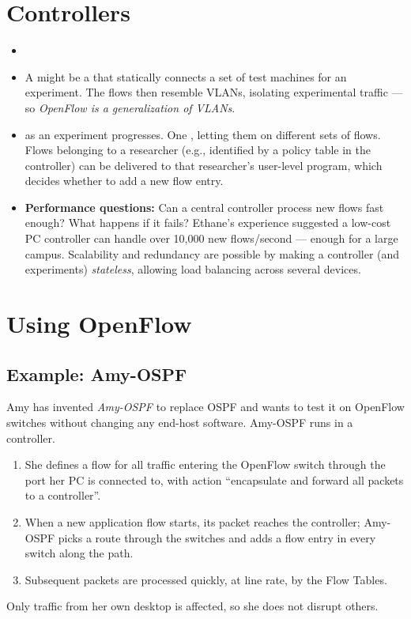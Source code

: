 \section{Controllers}
\begin{itemize}
\item {}
\item A  might be a  that statically connects a set of test machines for an experiment. The flows then resemble VLANs, isolating experimental traffic --- so \emph{OpenFlow is a generalization of VLANs}.
\item {}  as an experiment progresses. One , letting them  on different sets of flows. Flows belonging to a researcher (e.g., identified by a policy table in the controller) can be delivered to that researcher's user-level program, which decides whether to add a new flow entry.
\item \textbf{Performance questions:} Can a central controller process new flows fast enough? What happens if it fails? Ethane's experience suggested a low-cost PC controller can handle over 10,000 new flows/second --- enough for a large campus. Scalability and redundancy are possible by making a controller (and experiments) \emph{stateless}, allowing load balancing across several devices.
\end{itemize}

\section{Using OpenFlow}
\subsection{Example: Amy-OSPF}
Amy has invented \emph{Amy-OSPF} to replace OSPF and wants to test it on OpenFlow switches without changing any end-host software. Amy-OSPF runs in a controller.
\begin{enumerate}
\item She defines a flow for all traffic entering the OpenFlow switch through the port her PC is connected to, with action ``encapsulate and forward all packets to a controller''.
\item When a new application flow starts, its packet reaches the controller; Amy-OSPF picks a route through the switches and adds a flow entry in every switch along the path.
\item Subsequent packets are processed quickly, at line rate, by the Flow Tables.
\end{enumerate}
Only traffic from her own desktop is affected, so she does not disrupt others.

